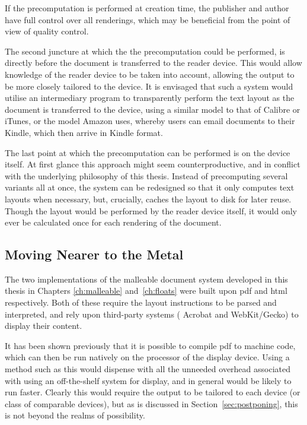 If the precomputation is performed at creation time, the publisher and author have full control over all renderings, which may be beneficial from the point of view of quality control. 

The second juncture at which the the precomputation could be performed, is directly before the document is transferred to the reader device. This would allow knowledge of the reader device to be taken into account, allowing the output to be more closely tailored to the device. It is envisaged that such a system would utilise an intermediary program to transparently perform the text layout as the document is transferred to the device, using a similar model to that of Calibre or iTunes, or the model Amazon uses, whereby users can email documents to their Kindle, which then arrive in Kindle format.

The last point at which the precomputation can be performed is on the device itself. At first glance this approach might seem counterproductive, and in conflict with the underlying philosophy of this thesis. Instead of precomputing several variants all at once, the system can be redesigned so that it only computes text layouts when necessary, but, crucially, caches the layout to disk for later reuse. Though the layout would be performed by the \ebook{} reader device itself, it would only ever be calculated once for each rendering of the document.

\subsection{Moving Nearer to the Metal}
The two implementations of the malleable document system developed in this thesis in Chapters \ref{ch:malleable} and~\ref{ch:floats} were built upon \gls{pdf} and \gls{html} respectively. Both of these require the layout instructions to be parsed and interpreted, and rely upon third-party systems (\eg{} Acrobat and WebKit/Gecko) to display their content.

It has been shown previously\hspace{0pt}\cite{Bagley2010} that it is possible to compile \gls{pdf} to machine code, which can then be run natively on the processor of the display device. Using a method such as this would dispense with all the unneeded overhead associated with using an off-the-shelf system for display, and in general would be likely to run faster. Clearly this would require the output to be tailored to each device (or class of comparable devices), but as is discussed in Section~\ref{sec:postponing}, this is not beyond the realms of possibility.



